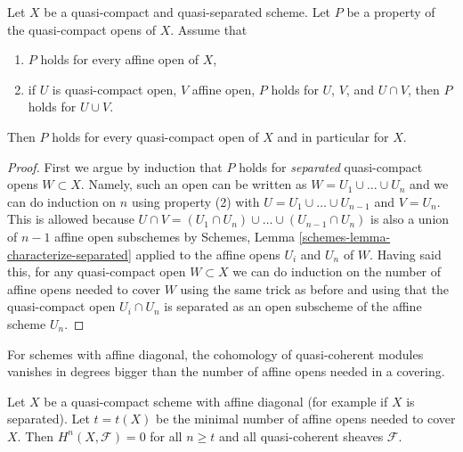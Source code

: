 \begin{lemma}
\label{lemma-induction-principle}
\begin{reference}
\cite[Proposition 3.3.1]{BvdB}
\end{reference}
Let $X$ be a quasi-compact and quasi-separated scheme. Let $P$ be a property
of the quasi-compact opens of $X$. Assume that
\begin{enumerate}
\item $P$ holds for every affine open of $X$,
\item if $U$ is quasi-compact open, $V$ affine open,
$P$ holds for $U$, $V$, and $U \cap V$, then
$P$ holds for $U \cup V$.
\end{enumerate}
Then $P$ holds for every quasi-compact open of $X$
and in particular for $X$.
\end{lemma}

\begin{proof}
First we argue by induction that $P$ holds for {\it separated} quasi-compact
opens $W \subset X$. Namely, such an open can be written as
$W = U_1 \cup \ldots \cup U_n$ and we can do induction on $n$ using
property (2) with $U = U_1 \cup \ldots \cup U_{n - 1}$ and $V = U_n$.
This is allowed because
$U \cap V = (U_1 \cap U_n) \cup \ldots \cup (U_{n - 1} \cap U_n)$
is also a union of $n - 1$ affine open subschemes by
Schemes, Lemma \ref{schemes-lemma-characterize-separated}
applied to the affine opens $U_i$ and $U_n$ of $W$.
Having said this, for any quasi-compact open $W \subset X$ we can
do induction on the number of affine opens needed to cover $W$
using the same trick as before and using that the quasi-compact open
$U_i \cap U_n$ is separated as an open subscheme of the affine scheme $U_n$.
\end{proof}

\begin{lemma}
\label{lemma-vanishing-nr-affines}
\begin{slogan}
For schemes with affine diagonal, the cohomology of quasi-coherent
modules vanishes in degrees bigger than the number of affine
opens needed in a covering.
\end{slogan}
Let $X$ be a quasi-compact scheme with affine diagonal (for example
if $X$ is separated).
Let $t = t(X)$ be the minimal number of affine opens needed to
cover $X$. Then $H^n(X, \mathcal{F}) = 0$ for all $n \geq t$ and all
quasi-coherent sheaves $\mathcal{F}$.
\end{lemma}

